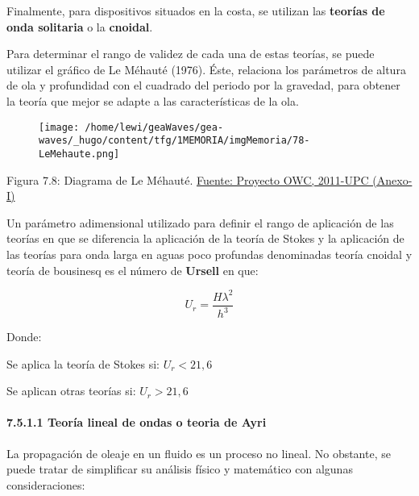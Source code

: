 Finalmente, para dispositivos situados en la costa, se utilizan las
\textbf{teorías de onda solitaria} o la \textbf{cnoidal}.

Para determinar el rango de validez de cada una de estas teorías, se
puede utilizar el gráfico de Le Méhauté (1976). Éste, relaciona los
parámetros de altura de ola y profundidad con el cuadrado del periodo
por la gravedad, para obtener la teoría que mejor se adapte a las
características de la ola.

\begin{figure}
\centering
\texttt{[image: /home/lewi/geaWaves/gea-waves/\_hugo/content/tfg/1MEMORIA/imgMemoria/78-LeMehaute.png]}
\caption{}
\end{figure}

Figura 7.8: Diagrama de Le Méhauté.
\href{http://upcommons.upc.edu/pfc/handle/2099.1/13595}{Fuente: Proyecto
OWC, 2011-UPC (Anexo-I)}

Un parámetro adimensional utilizado para definir el rango de aplicación
de las teorías en que se diferencia la aplicación de la teoría de Stokes
y la aplicación de las teorías para onda larga en aguas poco profundas
denominadas teoría cnoidal y teoría de bousinesq es el número de
\textbf{Ursell} en que:

\[U_r= \frac{H\lambda^2}{h^3}\]

Donde:

 Se aplica la teoría de Stokes si: \(U_r<21,6\)

 Se aplican otras teorías si: \(U_r>21,6\)

\paragraph{7.5.1.1 Teoría lineal de ondas o teoria de
Ayri}\label{header-n180}

La propagación de oleaje en un fluido es un proceso no lineal. No
obstante, se puede tratar de simplificar su análisis físico y matemático
con algunas consideraciones:

